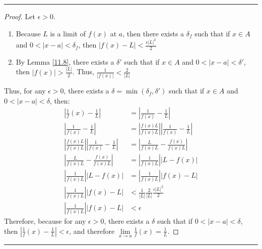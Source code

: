 \documentclass[openany, amssymb, psamsfonts]{amsart}
\theoremstyle{definition}
\numberwithin{equation}{section}
\begin{document}
\vspace{4pt}     \hrule   \vspace{4pt}\begin{proof}
Let $\epsilon >0$. 
\begin{enumerate}
    \item Because $L$ is a limit of $f(x)$ at $a$, then there exists a $\delta_f$ such that if $x\in A$ and $0< |x-a|<\delta_f$, then $|f(x) - L|<\frac{\epsilon|L|^2}{2}$
    \item By Lemma \ref{11.8}, there exists a $\delta'$ such that if $x\in A$ and $0<|x-a|<\delta'$, then $|f(x)|>\frac{|L|}{2}$. Thus, $\frac{1}{|f(x)|}< \frac{2}{|L|}$
\end{enumerate}
Thus, for any $\epsilon >0$, there exists a $\delta = \min(\delta_f, \delta')$ such  that if $x\in A$ and $0< |x-a|< \delta$, then:
\begin{align*}
    |\frac{1}{f}(x)  - \frac{1}{L}| &= |\frac{1}{f(x)}-\frac{1}{L}|\\
    |\frac{1}{f(x)}-\frac{1}{L}| &= |\frac{f(x)L}{f(x)L}||\frac{1}{f(x)}  - \frac{1}{L}|\\
    |\frac{f(x)L}{f(x)L}||\frac{1}{f(x)}  - \frac{1}{L}| &= |\frac{L}{f(x)L}  - \frac{f(x)}{f(x)L}|\\
    |\frac{L}{f(x)L}  - \frac{f(x)}{f(x)L}| &= |\frac{1}{f(x)L}||L-f(x)|\\
    \tag{Example 8.5} |\frac{1}{f(x)L}||L-f(x)| &= |\frac{1}{f(x)L}||f(x)-L|\\
    |\frac{1}{f(x)L}||f(x)-L| &< \frac{1}{|L|}\frac{2}{|L|}\frac{\epsilon|L|^2}{2}\\
    |\frac{1}{f(x)L}||f(x)-L| &< \epsilon
\end{align*}
Therefore, because for any $\epsilon >0$, there exists a $\delta$ such that if $0<|x-a|<\delta$, then $|\frac{1}{f}(x) - \frac{1}{L}| < \epsilon$, and therefore $\lim\limits_{x \to a} \frac{1}{f}(x) = \frac{1}{L}$.
\end{proof} \vspace{4pt}     \hrule   \vspace{4pt}
\end{document}
